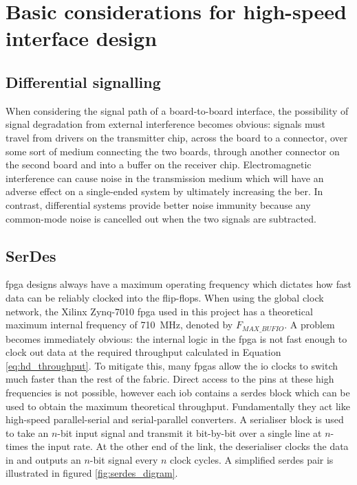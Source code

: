 
\section{Basic considerations for high-speed interface design}

\subsection{Differential signalling}

When considering the signal path of a board-to-board interface, the possibility of signal degradation from external interference becomes obvious: signals must travel from drivers on the transmitter chip, across the board to a connector, over some sort of medium connecting the two boards, through another connector on the second board and into a buffer on the receiver chip. Electromagnetic interference can cause noise in the transmission medium which will have an adverse effect on a single-ended system by ultimately increasing the \gls{ber}. In contrast, differential systems provide better noise immunity because any common-mode noise is cancelled out when the two signals are subtracted.

\subsection{SerDes}
\gls{fpga} designs always have a maximum operating frequency which dictates how fast data can be reliably clocked into the flip-flops. When using the global clock network, the Xilinx Zynq-7010 \gls{fpga} used in this project has a theoretical maximum internal frequency of \SI{710}{\mega\hertz}, denoted by \(F_{MAX\_BUFIO}\)\cite{xilinx:ds187}. A problem becomes immediately obvious: the internal logic in the \gls{fpga} is not fast enough to clock out data at the required throughput calculated in Equation \ref{eq:hd_throughput}. To mitigate this, many \glspl{fpga} allow the \gls{io} clocks to switch much faster than the rest of the fabric. Direct access to the pins at these high frequencies is not possible, however each \gls{iob} contains a \gls{serdes} block which can be used to obtain the maximum theoretical throughput. Fundamentally they act like high-speed parallel-serial and serial-parallel converters. A serialiser block is used to take an \(n\)-bit input signal and transmit it bit-by-bit over a single line at \(n\)-times the input rate. At the other end of the link, the deserialiser clocks the data in and outputs an \(n\)-bit signal every \(n\) clock cycles. A simplified \gls{serdes} pair is illustrated in figured \ref{fig:serdes_digram}.

